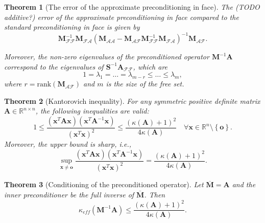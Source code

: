 \documentclass[10pt,a4paper]{amsart}
\newtheorem{theorem}{Theorem}
\newcommand{\MA}{\bm{A}}
\newcommand{\MM}{\bm{M}}
\newcommand{\MS}{\bm{S}}
\newcommand{\Vo}{\bm{o}}
\newcommand{\Vx}{\bm{x}}
\begin{document}
\begin{theorem}[The error of the approximate preconditioning in face]
  \label{theo:eigvals}
  The (TODO additive?) error of the approximate preconditioning in face compared to the standard preconditioning in face is given by
\begin{equation*}
  \MM_{\mathcal{F}\mathcal{F}}^{-1} \MM_{\mathcal{F}\mathcal{A}} ( \MM_{\mathcal{A}\mathcal{A}} - \MM_{\mathcal{A}\mathcal{F}} \MM_{\mathcal{F}\mathcal{F}}^{-1} \MM_{\mathcal{F}\mathcal{A}})^{-1} \MM_{\mathcal{A}\mathcal{F}}.
\end{equation*}

Moreover, the non-zero eigenvalues of the preconditioned operator $\MM^{-1}\MA$ correspond to the eigenvalues of $\MS^{-1}\MA_{\mathcal{FF}}$, which are
\begin{equation*}
  1 = \lambda_1 = \dots = \lambda_{m-r} \le \dots \le \lambda_m,
\end{equation*}
where $r=\text{rank}(\MM_{\mathcal{AF}})$ and $m$ is the size of the free set.
\end{theorem}

\begin{theorem}[Kantorovich inequality]
  \label{theo:kant}
  For any symmetric positive definite matrix $\MA \in \mathbb{R}^{n \times n}$, the following inequalities are valid:
\begin{equation*}
  1 \leq \frac{\left(\Vx^{T} \MA \Vx \right) \left(\Vx^{T} \MA^{-1} \Vx\right)}{\left(\Vx^{T} \Vx\right)^{2}} \leq \frac{\left( \kappa\left( \MA \right) +1  \right)^{2}}{4\kappa(\MA)} \quad \forall \Vx \in \mathbb{R}^{n}\setminus \left\{\Vo \right\}.
\end{equation*}
Moreover, the upper bound is sharp, i.e.,
\begin{equation*}
  \sup_{\Vx \neq \Vo} \frac{\left(\Vx^{T} \MA \Vx \right) \left(\Vx^{T} \MA^{-1} \Vx\right)}{\left(\Vx^{T} \Vx\right)^{2}} = \frac{\left( \kappa\left( \MA \right) +1  \right)^{2}}{4\kappa(\MA)}.
\end{equation*}
\end{theorem}

\begin{theorem}[Conditioning of the preconditioned operator]
  \label{theo:condsimple}
  Let $\overline{\MM} = \MA$ and the inner preconditioner be the full inverse of $\overline{\MM}$. Then
    \begin{equation*}
      \kappa_{eff}\left(\MM^{-1}\MA\right) \leq \frac{\left( \kappa\left( \MA \right) +1  \right)^{2}}{4\kappa(\MA)}.
    \end{equation*}
\end{theorem}
\end{document}
